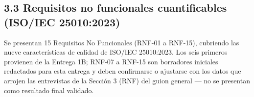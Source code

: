 \subsection*{3.3 Requisitos no funcionales cuantificables (ISO/IEC 25010:2023)}


Se presentan 15 Requisitos No Funcionales (RNF-01 a RNF-15), cubriendo las nueve características de calidad de ISO/IEC 25010:2023. Los seis primeros provienen de la Entrega 1B; RNF-07 a RNF-15 son borradores iniciales redactados para esta entrega y deben confirmarse o ajustarse con los datos que arrojen las entrevistas de la Sección 3 (RNF) del guion general --- no se presentan como resultado final validado.


